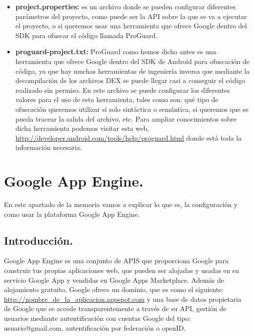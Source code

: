 \begin{itemize}
\begin{itemize}
\item \textbf{project.properties:} es un archivo donde se pueden configurar diferentes parámetros del proyecto, como puede ser la API sobre la que se va a ejecutar el proyecto, o si queremos usar una herramienta que ofrece Google dentro del SDK para ofuscar el código llamada ProGuard.

\item \textbf{proguard-project.txt:} ProGuard como hemos dicho antes es una herramienta que ofrece Google dentro del SDK de Android para ofuscación de código, ya que hay muchas herramientas de ingeniería inversa que mediante la decompilación de los archivos DEX se puede llegar casi a conseguir el código realizado sin permiso. En este archivo se puede configurar los diferentes valores para el uso de esta herramienta, tales como son: qué tipo de ofuscación queremos utilizar si solo sintáctica o semántica, si queremos que se pueda tracear la salida del archivo, etc. Para ampliar conocimientos sobre dicha herramienta podemos visitar esta web, \url{http://developer.android.com/tools/help/proguard.html} donde está toda la información necesaria.

\end{itemize}



\section{Google App Engine.}\label{cap:GAE}
En este apartado de la memoria vamos a explicar lo que es, la configuración y como usar la plataforma Google App Engine.

\subsection{Introducción.}
Google App Engine es una conjunto de APIS que proporciona Google para construir tus propias aplicaciones web, que pueden ser alojadas y usadas en su servicio Google App y vendidas en Google Apps Marketplace. Además de alojamiento gratuito, Google ofrece un dominio, que es como el siguiente: \url{http://nombre\_de\_la\_aplicacion.appspot.com} y una base de datos propietaria de Google que se accede transparentemente a través de su API, gestión de usuarios mediante autentificación con cuentas Google del tipo: usuario@gmail.com, autentificación por federación o openID.


\end{itemize}
